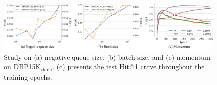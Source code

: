 \begin{figure}[t]
    \centering
    \setlength{\abovecaptionskip}{2mm}
    \centering
    \includegraphics[width=.98\linewidth]{img/selfkg_ablation.pdf}
    \caption{Study on (a) negative queue size, (b) batch size, and (c) momentum on DBP15K$_{\text{zh\_en}}$. (c) presents the test Hit@1 curve throughout the training epochs.}
    \label{fig:size_study}
\end{figure}


